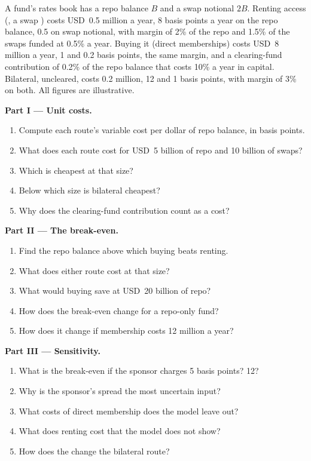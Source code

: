 \begin{problem}\label{pb:m2:getting-access-rates-credit:1}
A fund's rates book has a repo balance $B$ and a swap notional $2B$. Renting access
(, a swap ) costs USD~0.5 million a year, 8 basis points a
year on the repo balance, 0.5 on swap notional, with margin of 2\% of the repo and 1.5\% of
the swaps funded at 0.5\% a year. Buying it (direct memberships) costs USD~8 million a
year, 1 and 0.2 basis points, the same margin, and a clearing-fund contribution of 0.2\%
of the repo balance that costs 10\% a year in capital. Bilateral, uncleared, costs 0.2
million, 12 and 1 basis points, with margin of 3\% on both. All figures are illustrative.

\medskip\noindent\textbf{Part I --- Unit costs.}
\begin{enumerate}
\item Compute each route's variable cost per dollar of repo balance, in basis points.
\item What does each route cost for USD~5 billion of repo and 10 billion of swaps?
\item Which is cheapest at that size?
\item Below which size is bilateral cheapest?
\item Why does the clearing-fund contribution count as a cost?
\end{enumerate}

\medskip\noindent\textbf{Part II --- The break-even.}
\begin{enumerate}[resume]
\item Find the repo balance above which buying beats renting.
\item What does either route cost at that size?
\item What would buying save at USD~20 billion of repo?
\item How does the break-even change for a repo-only fund?
\item How does it change if membership costs 12 million a year?
\end{enumerate}

\medskip\noindent\textbf{Part III --- Sensitivity.}
\begin{enumerate}[resume]
\item What is the break-even if the sponsor charges 5 basis points? 12?
\item Why is the sponsor's spread the most uncertain input?
\item What costs of direct membership does the model leave out?
\item What does renting cost that the model does not show?
\item How does the  change the bilateral route?
\end{enumerate}


\end{problem}
